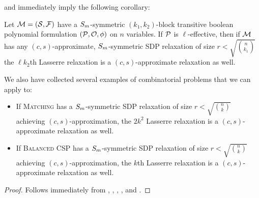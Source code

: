  and  immediately imply the following corollary:
\begin{corollary}\label{cor:lass-optimal}
Let $\mathcal M = (\mathcal S, \mathcal F)$ have a $S_{m}$-symmetric $(k_1,k_2)$-block transitive boolean polynomial formulation $(\mathcal P, \mathcal O, \phi)$ on $n$ variables. If $\mathcal P$ is $\ell$-effective, then if $\mathcal M$ has any $(c,s)$-approximate, $S_{m}$-symmetric SDP relaxation of size $r < \sqrt{\binom{n}{k_1}}$ the $\ell k_2$th Lasserre relaxation is a $(c,s)$-approximate relaxation as well.
\end{corollary}
We also have collected several examples of combinatorial problems that we can apply  to:
\begin{corollary}\label{cor:matching_bcsp_optimal}
\leavevmode
\begin{itemize}
\item If \textsc{Matching} has a $S_{m}$-symmetric SDP relaxation of size $r < \sqrt{\binom{n}{k}}$ achieving $(c,s)$-approximation, the $2k^2$ Lasserre relaxation is a $(c,s)$-approximate relaxation as well.
\item If \textsc{Balanced CSP} has a $S_{m}$-symmetric SDP relaxation of size $r < \sqrt{\binom{n}{k}}$ achieving $(c,s)$-approximation, the $k$th Lasserre relaxation is a $(c,s)$-approximate relaxation as well.
\end{itemize}
\end{corollary}
\begin{proof}
Follows immediately from , , , ,  and .
\end{proof}

